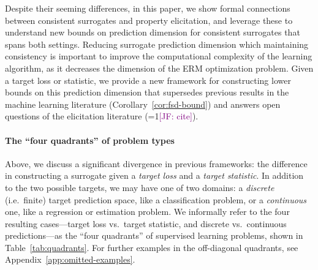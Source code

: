 \documentclass[anon,12pt]{colt2021} %
\newcommand{\Comments}{1}
\newcommand{\mynote}[2]{\ifnum\Comments=1\textcolor{#1}{#2}\fi}
\newcommand{\jessie}[1]{\mynote{purple}{[JF: #1]}}
\begin{document}
Despite their seeming differences, in this paper, we show formal connections between consistent surrogates and property elicitation, and leverage these to understand new bounds on prediction dimension for consistent surrogates that spans both settings. 
Reducing surrogate prediction dimension which maintaining consistency is important to improve the computational complexity of the learning algorithm, as it decreases the dimension of the ERM optimization problem.
Given a target loss or statistic, we provide a new framework for constructing lower bounds on this prediction dimension that supersedes previous results in the machine learning literature (Corollary~\ref{cor:fsd-bound}) and answers open questions of the elicitation literature (\jessie{cite}). 


\paragraph{The ``four quadrants'' of problem types}
Above, we discuss a significant divergence in previous frameworks: the difference in constructing a surrogate given a \emph{target loss} and a \emph{target statistic}.
In addition to the two possible targets, we may have one of two domains: a \emph{discrete} (i.e.\ finite) target prediction space, like a classification problem, or a \emph{continuous} one, like a regression or estimation problem.
We informally refer to the four resulting cases---target loss vs.\ target statistic, and discrete vs.\ continuous predictions---as the ``four quadrants'' of supervised learning problems, shown in Table~\ref{tab:quadrants}.
For further examples in the off-diagonal quadrants, see Appendix~\ref{app:omitted-examples}.
\end{document}
